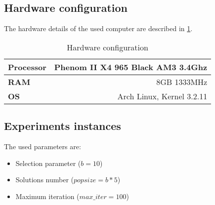 \subsection{Hardware configuration}

The hardware details of the used computer are described in \ref{tab:table1}.

\begin{table}
    \centering
    \begin{tabular}{|l|r|}
        \hline
        \textbf{Processor} & Phenom II X4 965 Black AM3 3.4Ghz\\\hline
        \textbf{RAM} & 8GB 1333MHz\\\hline
        \textbf{OS} & Arch Linux, Kernel 3.2.11 \\\hline
    \end{tabular}
    \label{tab:table1}
    \caption{Hardware configuration}
\end{table}

\subsection{Experiments instances}

The used parameters are:
\begin{itemize}
    \item Selection parameter ($b = 10$)
    \item Solutions number    ($popsize = b*5$)
    \item Maximum iteration   ($max\_iter = 100$)
\end{itemize}

